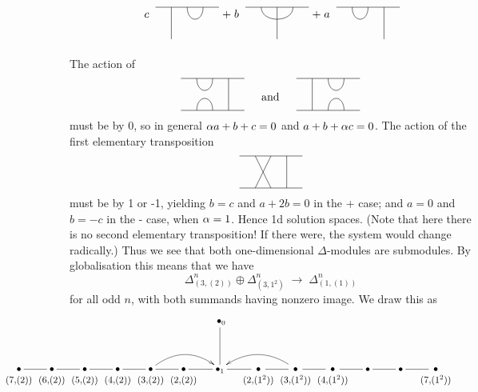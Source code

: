 \[ 
\rb{c\;} \begin{tikzpicture}
     \draw (0,0) -- (2,0) ;
     \draw (.5,0) -- (.5,-1);
     \draw (1,0) .. controls (1,-.5) and (1.5,-.5) .. (1.5,0) ;
 \end{tikzpicture}
 \rb{+\;b\;} \begin{tikzpicture}
     \draw (0,0) -- (2,0) ;
     \draw (1,0) -- (1,-1);
     \draw (.5,0) .. controls (.5,-.5) and (1.5,-.5) .. (1.5,0) ;
 \end{tikzpicture}
 \rb{+\;a\;} \begin{tikzpicture}
     \draw (0,0) -- (2,0) ;
     \draw (1.5,0) -- (1.5,-1);
     \draw (.5,0) .. controls (.5,-.5) and (1.0,-.5) .. (1,0) ;
 \end{tikzpicture}
\]
\medskip \medskip 


\noindent 
The action of 
\[
\UI \;\;\;\mbox{ and } \;\;\;  \IU 
\]
must be by 0, so in general 
$\alpha a+b+c=0$ and $a+b+\alpha c=0$. 
The action of the first elementary transposition
\[
\SigI  
\]
must be by 1 or -1, yielding $b=c$ and $a+2b=0$ in the + case; and $a=0$ and $b=-c$ in the - case, when $\alpha=1$. Hence 1d solution spaces. 
(Note that here there is no second elementary transposition! If there were, the system would change radically.)
Thus we see that both one-dimensional $\Delta$-modules are submodules. 
By globalisation this means that we have 
\[
\Delta^{n}_{(3,(2))} \oplus \Delta^{n}_{(3,1^2)} \; \rightarrow\; \Delta^{n}_{(1,(1))}
\]
for all odd $n$, with both summands having nonzero image. 
We draw this as
\[
\hspace{-2.1cm} 
\xymatrix{
   &&&&&& \;\bullet_0 \ar@{-}[d] \\
\ver{(7,\!(2))} \ar@{-}[r] & 
\ver{(6,\!(2))} \ar@{-}[r] & 
\ver{(5,\!(2))} \ar@{-}[r] & 
\ver{(4,\!(2))} \ar@{-}[r]  & 
\ver{(3,\!(2))} \ar@{-}[r] \ar@[red]@/^1.3pc/[rr] & 
\ver{(2,\!(2))} \ar@{-}[r] & 
\bullet_1 \ar@{-}[r] & 
\ver{(2,\!(1^2))} \ar@{-}[r] & 
\ver{(3,\!(1^2))} \ar@{-}[r] \ar@[red]@/_1.3pc/[ll] & 
\ver{(4,\!(1^2))} \ar@{-}[r] & 
\bullet \ar@{-}[r] & 
\bullet \ar@{-}[r] & 
\ver{(7,\!(1^2))} & 
}
\] 

